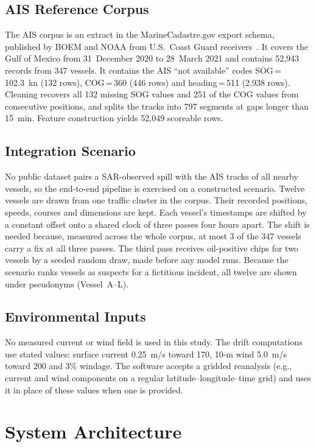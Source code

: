 \documentclass[conference]{IEEEtran}
\begin{document}
\subsection{AIS Reference Corpus}
The AIS corpus is an extract in the MarineCadastre.gov export schema, published by
BOEM and NOAA from U.S.\ Coast Guard receivers~\cite{marinecadastre}. It covers the Gulf
of Mexico from 31~December 2020 to 28~March 2021 and contains 52,943 records from 347
vessels. It contains the AIS ``not available'' codes SOG\,=\,102.3~kn (132 rows),
COG\,=\,360\textdegree{} (446 rows) and heading\,=\,511 (2,938 rows). Cleaning recovers
all 132 missing SOG values and 251 of the COG values from consecutive positions, and
splits the tracks into 797 segments at gaps longer than 15~min. Feature construction
yields 52,049 scoreable rows.

\subsection{Integration Scenario}
\label{sec:scenario}
No public dataset pairs a SAR-observed spill with the AIS tracks of all nearby vessels,
so the end-to-end pipeline is exercised on a constructed scenario. Twelve vessels are
drawn from one traffic cluster in the corpus. Their recorded positions, speeds, courses
and dimensions are kept. Each vessel's timestamps are shifted by a constant offset onto
a shared clock of three passes four hours apart. The shift is needed because, measured
across the whole corpus, at most 3 of the 347 vessels carry a fix at all three passes.
The third pass receives oil-positive chips for two vessels by a seeded random draw, made
before any model runs. Because the scenario ranks vessels as suspects for a fictitious
incident, all twelve are shown under pseudonyms (Vessel~A--L).

\subsection{Environmental Inputs}
No measured current or wind field is used in this study. The drift computations use
stated values: surface current 0.25~m/s toward 170\textdegree, 10-m wind 5.0~m/s toward
200\textdegree{} and 3\% windage. The software accepts a gridded reanalysis (e.g.,
current and wind components on a regular latitude--longitude--time grid) and uses it
in place of these values when one is provided.

\section{System Architecture}
\end{document}
